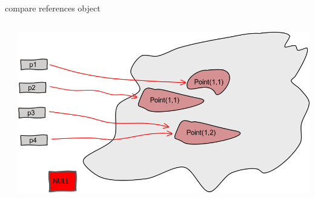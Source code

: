 \documentclass[a4paper, 11pt]{beamer}
\begin{document}

\begin{frame}{compare references object}

\begin{columns}
    \begin{column}{.3\linewidth}
      \inputminted[bgcolor=bg, fontsize=\tiny]{java}{./src/equal/EqualRef2Result.java}        
    \end{column}
\vline
    \begin{column}{.5\linewidth}
       \includegraphics[scale=0.2]{img/equal.png}
   
    \end{column}
  \end{columns}
\end{frame}
\end{document}
